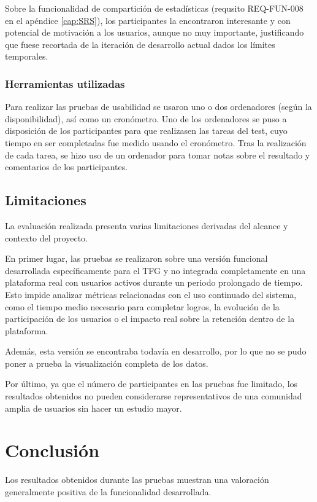 Sobre la funcionalidad de compartición de estadísticas (requsito REQ-FUN-008 en el apéndice \ref{cap:SRS}), los participantes la encontraron interesante y con potencial de motivación a los usuarios, aunque no muy importante, justificando que fuese recortada de la iteración de desarrollo actual dados los límites temporales.

\subsubsection{Herramientas utilizadas}

Para realizar las pruebas de usabilidad se usaron uno o dos ordenadores (según la disponibilidad), así como un cronómetro.
Uno de los ordenadores se puso a disposición de los participantes para que realizasen las tareas del test, cuyo tiempo en ser completadas fue medido usando el cronómetro. Tras la realización de cada tarea, se hizo uso de un ordenador para tomar notas sobre el resultado y comentarios de los participantes.

\subsection{Limitaciones}

La evaluación realizada presenta varias limitaciones derivadas del alcance y contexto del proyecto.

En primer lugar, las pruebas se realizaron sobre una versión funcional desarrollada específicamente para el TFG y no integrada completamente en una plataforma real con usuarios activos durante un periodo prolongado de tiempo. Esto impide analizar métricas relacionadas con el uso continuado del sistema, como el tiempo medio necesario para completar logros, la evolución de la participación de los usuarios o el impacto real sobre la retención dentro de la plataforma.

Además, esta versión se encontraba todavía en desarrollo, por lo que no se pudo poner a prueba la visualización completa de los datos.

Por último, ya que el número de participantes en las pruebas fue limitado, los resultados obtenidos no pueden considerarse representativos de una comunidad amplia de usuarios sin hacer un estudio mayor.


\section{Conclusión}

Los resultados obtenidos durante las pruebas muestran una valoración generalmente positiva de la funcionalidad desarrollada.

